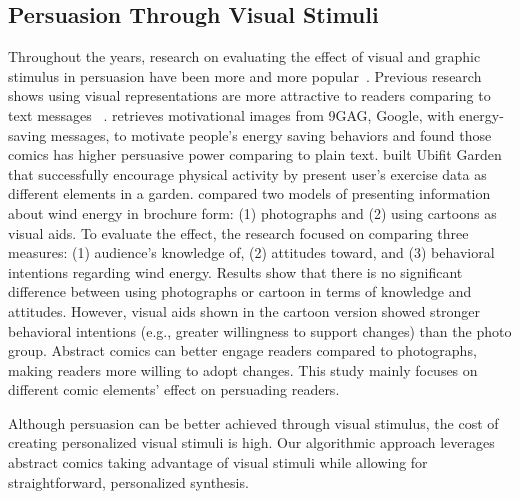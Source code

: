 \subsection{Persuasion Through Visual Stimuli}
Throughout the years, research on evaluating the effect of visual and graphic stimulus in persuasion have been more and more popular~\cite{selker2015sweetbuildinggreeter,consolvo2008activity}. Previous research shows using visual representations are more attractive to readers comparing to text messages ~\cite{selker2015sweetbuildinggreeter,consolvo2008activity}.  \textcite{selker2015sweetbuildinggreeter} retrieves motivational images from 9GAG, Google, with energy-saving messages, to motivate people's energy saving behaviors and found those comics has higher persuasive power comparing to plain text. \textcite{consolvo2008activity} built Ubifit Garden that successfully encourage physical activity by present user's exercise data as different elements in a garden. \textcite{lin2013impact} compared two models of presenting information about wind energy in brochure form: (1) photographs and (2) using cartoons as visual aids. To evaluate the effect, the research focused on comparing three measures: (1) audience's knowledge of, (2) attitudes toward, and (3) behavioral intentions regarding wind energy. Results show that there is no significant difference between using photographs or cartoon in terms of knowledge and attitudes. However, visual aids shown in the cartoon version showed stronger behavioral intentions (e.g., greater willingness to support changes) than the photo group. Abstract comics can better engage readers compared to photographs, making readers more willing to adopt changes. This study mainly focuses on different comic elements' effect on persuading readers.

Although persuasion can be better achieved through visual stimulus, the cost of creating personalized visual stimuli is high. Our algorithmic approach leverages abstract comics taking advantage of visual stimuli while allowing for straightforward, personalized synthesis.
